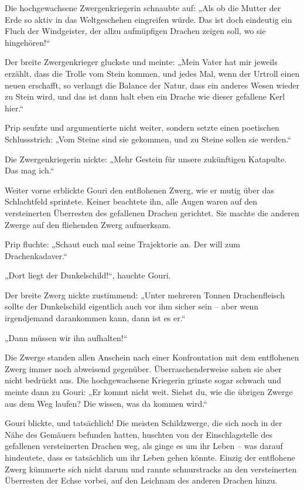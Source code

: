 Die hochgewachsene Zwergenkriegerin schnaubte auf: „Als ob die Mutter der Erde so aktiv in das Weltgeschehen eingreifen würde. Das ist doch eindeutig ein Fluch der Windgeister, der allzu aufmüpfigen Drachen zeigen soll, wo sie hingehören!“

Der breite Zwergenkrieger gluckste und meinte: „Mein Vater hat mir jeweils erzählt, dass die Trolle vom Stein kommen, und jedes Mal, wenn der Urtroll einen neuen erschafft, so verlangt die Balance der Natur, dass ein anderes Wesen wieder zu Stein wird, und das ist dann halt eben ein Drache wie dieser gefallene Kerl hier.“

Prip seufzte und argumentierte nicht weiter, sondern setzte einen poetischen Schlussstrich: „Vom Steine sind sie gekommen, und zu Steine sollen sie werden.“

Die Zwergenkriegerin nickte: „Mehr Gestein für unsere zukünftigen Katapulte. Das mag ich.“

Weiter vorne erblickte Gouri den entflohenen Zwerg, wie er mutig über das Schlachtfeld sprintete. Keiner beachtete ihn, alle Augen waren auf den versteinerten Überresten des gefallenen Drachen gerichtet. Sie machte die anderen Zwerge auf den fliehenden Zwerg aufmerksam.

Prip fluchte: „Schaut euch mal seine Trajektorie an. Der will zum Drachenkadaver.“

„Dort liegt der Dunkelschild!“, hauchte Gouri.

Der breite Zwerg nickte zustimmend: „Unter mehreren Tonnen Drachenfleisch sollte der Dunkelschild eigentlich auch vor ihm sicher sein – aber wenn irgendjemand darankommen kann, dann ist es er.“

„Dann müssen wir ihn aufhalten!“

Die Zwerge standen allen Anschein nach einer Konfrontation mit dem entflohenen Zwerg immer noch abweisend gegenüber. Überraschenderweise sahen sie aber nicht bedrückt aus. Die hochgewachsene Kriegerin grinste sogar schwach und meinte dann zu Gouri: „Er kommt nicht weit. Siehst du, wie die übrigen Zwerge aus dem Weg laufen? Die wissen, was da kommen wird.“

Gouri blickte, und tatsächlich! Die meisten Schildzwerge, die sich noch in der Nähe des Gemäuers befunden hatten, huschten von der Einschlagstelle des gefallenen versteinerten Drachen weg, als ginge es um ihr Leben – was darauf hindeutete, dass es tatsächlich um ihr Leben gehen könnte. Einzig der entflohene Zwerg kümmerte sich nicht darum und rannte schnurstracks an den versteinerten Überresten der Echse vorbei, auf den Leichnam des anderen Drachen hinzu.

